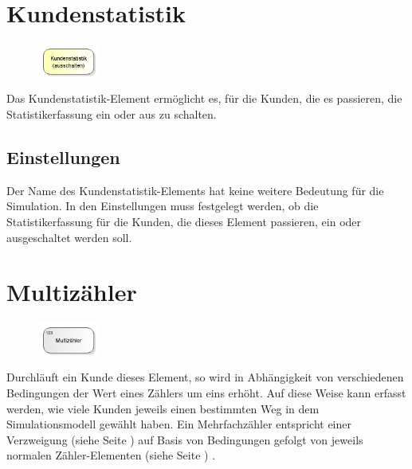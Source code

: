 \section{Kundenstatistik}
\label{ref:ModelElementSetStatisticsMode}

\begin{figure}
\vspace{-22pt}
\includegraphics[width=2cm]{imageModelElementSetStatisticsMode.png}
\vspace{-22pt}
\end{figure}

Das Kundenstatistik-Element ermöglicht es, für die Kunden, die es passieren,
die Statistikerfassung ein oder aus zu schalten.

\subsection*{Einstellungen}

Der Name des Kundenstatistik-Elements hat keine weitere Bedeutung für die Simulation.
In den Einstellungen muss festgelegt werden, ob die Statistikerfassung für die Kunden,
die dieses Element passieren, ein oder ausgeschaltet werden soll.


\section{Multizähler}
\label{ref:ModelElementCounterMulti}

\begin{figure}
\vspace{-22pt}
\includegraphics[width=2cm]{imageModelElementCounterMulti.png}
\vspace{-22pt}
\end{figure}

Durchläuft ein Kunde dieses Element, so wird in Abhängigkeit von verschiedenen Bedingungen
der Wert eines Zählers um eins erhöht. Auf diese Weise kann erfasst werden, wie viele Kunden
jeweils einen bestimmten Weg in dem Simulationsmodell gewählt haben. Ein Mehrfachzähler
entspricht einer Verzweigung (siehe Seite \pageref{ref:ModelElementDecide}) auf Basis von Bedingungen
gefolgt von jeweils normalen Zähler-Elementen (siehe Seite \pageref{ref:ModelElementCounter}) .

